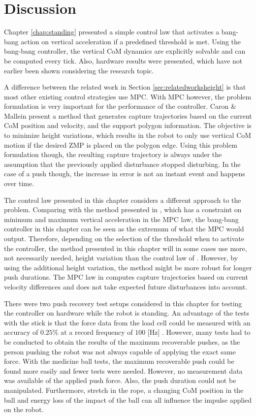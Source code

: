\section{Discussion}
Chapter \ref{chap:standing} presented a simple control law that activates a bang-bang action on vertical acceleration if a predefined threshold is met. Using the bang-bang controller, the vertical \ac{CoM} dynamics are explicitly solvable and can be computed every tick. Also, hardware results were presented, which have not earlier been shown considering the research topic. 

A difference between the related work in Section \ref{sec:relatedworksheight} is that most other existing control strategies use \ac{MPC}. With \ac{MPC} however, the problem formulation is very important for the performance of the controller. Caron \& Mallein \cite{caron2018balance} present a method that generates capture trajectories based on the current \ac{CoM} position and velocity, and the support polygon information. The objective is to minimize height variations, which results in the robot to only use vertical \ac{CoM} motion if the desired \ac{ZMP} is placed on the polygon edge. Using this problem formulation though, the resulting capture trajectory is always under the assumption that the previously applied disturbance stopped disturbing. In the case of a push though, the increase in error is not an instant event and happens over time.

The control law presented in this chapter considers a different approach to the problem. Comparing with the method presented in \cite{caron2018balance}, which has a constraint on minimum and maximum vertical acceleration in the \ac{MPC} law, the bang-bang controller in this chapter can be seen as the extremum of what the \ac{MPC} would output. Therefore, depending on the selection of the threshold when to activate the controller, the method presented in this chapter will in some cases use more, not necessarily needed, height variation than the control law of \cite{caron2018balance}. However, by using the additional height variation, the method might be more robust for longer push durations. The \ac{MPC} law in \cite{caron2018balance} computes capture trajectories based on current velocity differences and does not take expected future disturbances into account.

There were two push recovery test setups considered in this chapter for testing the controller on hardware while the robot is standing. An advantage of the tests with the stick is that the force data from the load cell could be measured with an accuracy of $0.25$\% at a record frequency of $100$ [Hz] \cite{iload}. However, many tests had to be conducted to obtain the results of the maximum recoverable pushes, as the person pushing the robot was not always capable of applying the exact same force. With the medicine ball tests, the maximum recoverable push could be found more easily and fewer tests were needed. However, no measurement data was available of the applied push force. Also, the push duration could not be manipulated. Furthermore, stretch in the rope, a changing \ac{CoM} position in the ball and energy loss of the impact of the ball can all influence the impulse applied on the robot.

